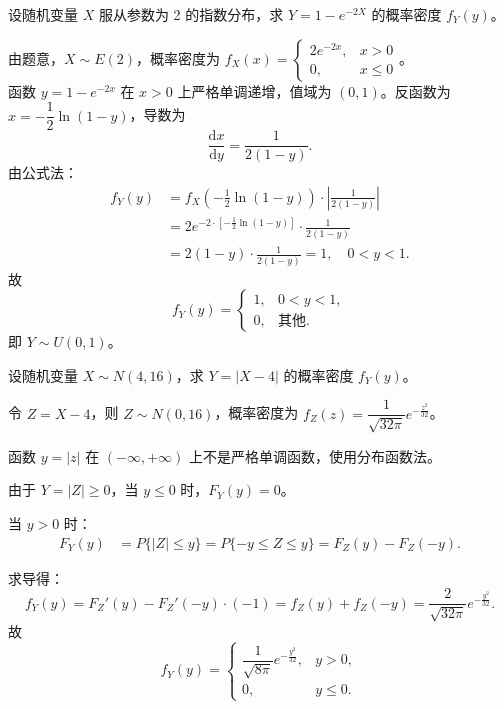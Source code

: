 ﻿\documentclass[lang=cn,11pt]{elegantbook}
\begin{document}
\begin{exercise}\label{exer:2-30}
设随机变量 $X$ 服从参数为 2 的指数分布，求 $Y=1-e^{-2X}$ 的概率密度 $f_Y(y)$。
\end{exercise}

\begin{solution}
由题意，$X \sim E(2)$，概率密度为 $f_X(x) = \begin{cases} 2e^{-2x}, & x>0 \\ 0, & x \le 0 \end{cases}$。\\
函数 $y = 1-e^{-2x}$ 在 $x>0$ 上严格单调递增，值域为 $(0,1)$。反函数为 $x = -\dfrac{1}{2}\ln(1-y)$，导数为
\[
\frac{\mathrm{d}x}{\mathrm{d}y} = \frac{1}{2(1-y)}.
\]
由公式法：
\begin{align*}
f_Y(y) &= f_X\!\left(-\frac{1}{2}\ln(1-y)\right) \cdot \left|\frac{1}{2(1-y)}\right| \\
&= 2e^{-2 \cdot \left[-\frac{1}{2}\ln(1-y)\right]} \cdot \frac{1}{2(1-y)} \\
&= 2(1-y) \cdot \frac{1}{2(1-y)} = 1, \quad 0 < y < 1.
\end{align*}
故
\[
f_Y(y) = \begin{cases}
1, & 0 < y < 1, \\[4pt]
0, & \text{其他}.
\end{cases}
\]
即 $Y \sim U(0,1)$。
\end{solution}

\begin{exercise}\label{exer:2-31}
设随机变量 $X \sim N(4,16)$，求 $Y=|X-4|$ 的概率密度 $f_Y(y)$。
\end{exercise}

\begin{solution}
令 $Z = X-4$，则 $Z \sim N(0,16)$，概率密度为 $f_Z(z) = \dfrac{1}{\sqrt{32\pi}} e^{-\frac{z^2}{32}}$。

函数 $y = |z|$ 在 $(-\infty,+\infty)$ 上不是严格单调函数，使用分布函数法。

由于 $Y = |Z| \ge 0$，当 $y \le 0$ 时，$F_Y(y) = 0$。

当 $y > 0$ 时：
\begin{align*}
F_Y(y) &= P\{|Z| \le y\} = P\{-y \le Z \le y\} = F_Z(y) - F_Z(-y).
\end{align*}

求导得：
\[
f_Y(y) = F_Z'(y) - F_Z'(-y) \cdot (-1) = f_Z(y) + f_Z(-y) = \frac{2}{\sqrt{32\pi}} e^{-\frac{y^2}{32}}.
\]
故
\[
f_Y(y) = \begin{cases}
\dfrac{1}{\sqrt{8\pi}} e^{-\frac{y^2}{32}}, & y > 0, \\[6pt]
0, & y \le 0.
\end{cases}
\]
\end{solution}
\end{document}
